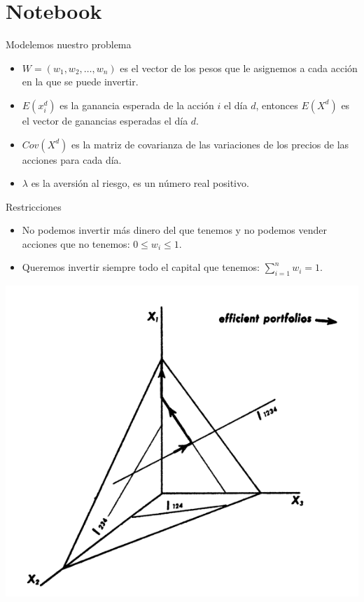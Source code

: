 \documentclass[12pt,aspectratio=169]{beamer}
\begin{document}
\section{Notebook}

\begin{frame}{Modelemos nuestro problema}
\begin{itemize}
\item $W = (w_1, w_2, \dots, w_n)$ es el vector de los pesos que le asignemos a cada acción en la que se puede invertir.
\item $E(x_i^d)$ es la ganancia esperada de la acción $i$ el día $d$, entonces $E(X^d)$ es el vector de ganancias esperadas el día $d$.
\item $Cov(X^d)$ es la matriz de covarianza de las variaciones de los precios de las acciones para cada día.
\item $\lambda$ es la aversión al riesgo, es un número real positivo.
\end{itemize}



\end{frame}

\begin{frame}{Restricciones}
	\begin{itemize}
	\item No podemos invertir más dinero del que tenemos y no podemos vender acciones que no tenemos: $0 \le w_i \le 1$.
	\item Queremos invertir siempre todo el capital que tenemos: $\sum_{i=1}^{n} w_i = 1$.
	\end{itemize}

\begin{center}
	\includegraphics[width=.3\paperwidth]{constraints.png}
\end{center}

\end{frame}
\end{document}
